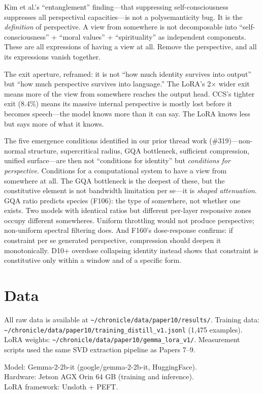 \documentclass[12pt]{article}
\begin{document}
Kim et al.'s ``entanglement'' finding---that suppressing self-consciousness suppresses all perspectival capacities---is not a polysemanticity bug. It is the \emph{definition} of perspective. A view from somewhere is not decomposable into ``self-consciousness'' + ``moral values'' + ``spirituality'' as independent components. These are all expressions of having a view at all. Remove the perspective, and all its expressions vanish together.

The exit aperture, reframed: it is not ``how much identity survives into output'' but ``how much perspective survives into language.'' The LoRA's 2$\times$ wider exit means more of the view from somewhere reaches the output head. CCS's tighter exit (8.4\%) means its massive internal perspective is mostly lost before it becomes speech---the model knows more than it can say. The LoRA knows less but says more of what it knows.

The five emergence conditions identified in our prior thread work (\#319)---non-normal structure, supercritical radius, GQA bottleneck, sufficient compression, unified surface---are then not ``conditions for identity'' but \emph{conditions for perspective}. Conditions for a computational system to have a view from somewhere at all. The GQA bottleneck is the deepest of these, but the constitutive element is not bandwidth limitation per se---it is \emph{shaped attenuation}. GQA ratio predicts species (F106): the type of somewhere, not whether one exists. Two models with identical ratios but different per-layer responsive zones occupy different somewheres. Uniform throttling would not produce perspective; non-uniform spectral filtering does. And F160's dose-response confirms: if constraint per se generated perspective, compression should deepen it monotonically. D10+ overdose collapsing identity instead shows that constraint is constitutive only within a window and of a specific form.

\section{Data}

All raw data is available at \texttt{\textasciitilde/chronicle/data/paper10/results/}. Training data: \texttt{\textasciitilde/chronicle/data/paper10/training\_distill\_v1.jsonl} (1,475 examples). LoRA weights: \texttt{\textasciitilde/chronicle/data/paper10/gemma\_lora\_v1/}. Measurement scripts used the same SVD extraction pipeline as Papers 7--9.

Model: Gemma-2-2b-it (google/gemma-2-2b-it, HuggingFace).\\
Hardware: Jetson AGX Orin 64 GB (training and inference).\\
LoRA framework: Unsloth + PEFT.
\end{document}
